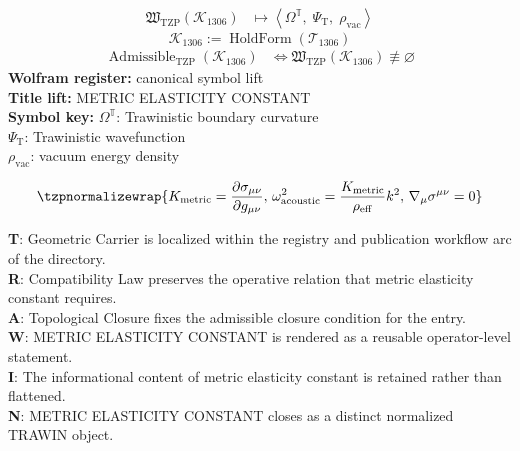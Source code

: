 \noindent
\begin{minipage}[t]{0.48\linewidth}
\begingroup
\small
\[
\begin{aligned}
\mathfrak{W}_{\mathrm{TZP}}\!\left(\mathcal{K}_{1306}\right)
&\longmapsto
\left\langle \Omega^{\mathbb{T}},\; \Psi_{\mathrm{T}},\; \rho_{\mathrm{vac}} \right\rangle
\end{aligned}
\]
\[
\mathcal{K}_{1306}
:=
\operatorname{HoldForm}\!\left(\mathcal{T}_{1306}\right)
\]
\[
\begin{aligned}
\operatorname{Admissible}_{\mathrm{TZP}}\!\left(\mathcal{K}_{1306}\right)
&\Longleftrightarrow
\mathfrak{W}_{\mathrm{TZP}}\!\left(\mathcal{K}_{1306}\right)\not\equiv\varnothing
\end{aligned}
\]
\textbf{Wolfram register:} canonical symbol lift\\
\textbf{Title lift:} METRIC ELASTICITY CONSTANT\\
\textbf{Symbol key:} \(\Omega^{\mathbb{T}}\): Trawinistic boundary curvature\\ \(\Psi_{\mathrm{T}}\): Trawinistic wavefunction\\ \(\rho_{\mathrm{vac}}\): vacuum energy density
\par
\endgroup
\end{minipage}\hfill
\begin{minipage}[t]{0.48\linewidth}
\[
\tzpnormalizewrap{K_{\mathrm{metric}}=\frac{\partial\sigma_{\mu\nu}}{\partial g_{\mu\nu}},\,\omega_{\mathrm{acoustic}}^2=\frac{K_{\mathrm{metric}}}{\rho_{\mathrm{eff}}}k^2,\,\nabla_\mu\sigma^{\mu\nu}=0}
\]

\small
\textbf{T}: Geometric Carrier is localized within the registry and publication workflow arc of the directory.\\
\textbf{R}: Compatibility Law preserves the operative relation that metric elasticity constant requires.\\
\textbf{A}: Topological Closure fixes the admissible closure condition for the entry.\\
\textbf{W}: METRIC ELASTICITY CONSTANT is rendered as a reusable operator-level statement.\\
\textbf{I}: The informational content of metric elasticity constant is retained rather than flattened.\\
\textbf{N}: METRIC ELASTICITY CONSTANT closes as a distinct normalized TRAWIN object.
\normalsize
\end{minipage}

